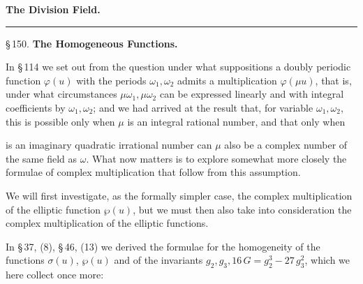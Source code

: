 
\begin{center}

{\Large \textbf{The Division Field.}}
\end{center}

\begin{center}
\rule{2cm}{0.4pt}
\end{center}

\begin{center}
\S\,150. \textbf{The Homogeneous  Functions.}
\end{center}

In \S\,114 we set out from the question under what suppositions a doubly
periodic function $\varphi(u)$ with the periods $\omega_1, \omega_2$
admits a multiplication $\varphi(\mu u)$, that is, under what
circumstances $\mu\omega_1, \mu\omega_2$ can be expressed linearly and
with integral coefficients by $\omega_1, \omega_2$; and we had arrived at
the result that, for variable $\omega_1, \omega_2$, this is possible only
when $\mu$ is an integral rational number, and that only when


is an imaginary quadratic irrational number can $\mu$ also be a complex
number of the same field as $\omega$. What now matters is to explore
somewhat more closely the formulae of complex multiplication that follow
from this assumption.

We will first investigate, as the formally simpler case, the complex
multiplication of the  elliptic function $\wp(u)$, but we must
then also take into consideration the complex multiplication of the
 elliptic functions.

In \S\,37, (8), \S\,46, (13) we derived the formulae for the
homogeneity of the functions $\sigma(u)$, $\wp(u)$ and of the invariants
$g_2, g_3, 16\,G = g_2^3 - 27\,g_3^2$, which we here collect once more:

